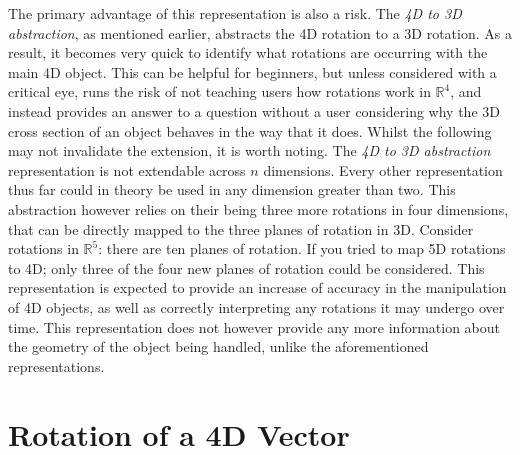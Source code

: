 \documentclass{l4proj}
\begin{document}
The primary advantage of this representation is also a risk. The \textit{4D to 3D abstraction}, as mentioned earlier, abstracts the 4D rotation to a 3D rotation. As a result, it becomes very quick to identify what rotations are occurring with the main 4D object. This can be helpful for beginners, but unless considered with a critical eye, runs the risk of not teaching users how rotations work in $\mathbb{R}^4$, and instead provides an answer to a question without a user considering why the 3D cross section of an object behaves in the way that it does.
Whilst the following may not invalidate the extension, it is worth noting. The \textit{4D to 3D abstraction} representation is not extendable across \(n\) dimensions. Every other representation thus far could in theory be used in any dimension greater than two. This abstraction however relies on their being three more rotations in four dimensions, that can be directly mapped to the three planes of rotation in 3D. Consider rotations in $\mathbb{R}^5$: there are ten planes of rotation. If you tried to map 5D rotations to 4D; only three of the four new planes of rotation could be considered.
This representation is expected to provide an increase of accuracy in the manipulation of 4D objects, as well as correctly interpreting any rotations it may undergo over time. This representation does not however provide any more information about the geometry of the object being handled, unlike the aforementioned representations.

\section{Rotation of a 4D Vector}
\end{document}
